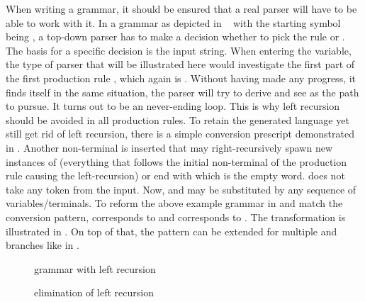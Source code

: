 When writing a grammar, it should be ensured that a real parser will have to be able to work with it. In a grammar as depicted in ~ with the starting symbol being , a top-down parser has to make a decision whether to pick the rule  or . The basis for a specific decision is the input string. When entering the  variable, the type of parser that will be illustrated here would investigate the first part of the first production rule , which again is . Without having made any progress, it finds itself in the same situation, the parser will try to derive  and see  as the path to pursue. It turns out to be an never-ending loop. This is why left recursion should be avoided in all production rules. To retain the generated language yet still get rid of left recursion, there is a simple conversion prescript demonstrated in . Another non-terminal is inserted that may right-recursively spawn new instances of \textalpha{} (everything that follows the initial non-terminal of the production rule causing the left-recursion) or end with \textemptyword{} which is the empty word. \textemptyword{} does not take any token from the input. Now, \textalpha{} and \textbeta{} may be substituted by any sequence of variables/terminals. To reform the above example grammar in  and match the conversion pattern, \textalpha{} corresponds to \textterminal{+}  and \textbeta{} corresponds to . The transformation is illustrated in . On top of that, the pattern can be extended for multiple \textalpha{} and \textbeta{} branches like in .

\begin{figure}[H]
	\centering
	
	

	\caption{grammar with left recursion}
	\label{fig:grammar_LR}
\end{figure}

\begin{figure}
	\centering

	

	\caption{elimination of left recursion}
	\label{fig:grammar_elimLR}
\end{figure}

